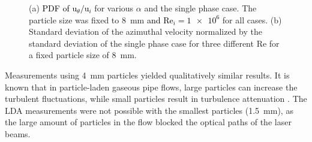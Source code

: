 \documentclass{jfm}
\newcommand\rey{\text{Re}}
\newcommand{\red}[1]{\textcolor{black}{#1}}
\begin{document}
\begin{figure}
\centering%
%
%
\caption{%
(a) \red{PDF of $\text{u}_\theta / \text{u}_i$} for various $\alpha$ and the
single phase case. The particle size was fixed to \SI{8}{\milli\metre}
\red{and $\rey_i=\num{1e6}$} for all cases. (b) Standard deviation of the
azimuthal velocity normalized by the standard deviation of the single phase
case for three different $\rey$ for a fixed particle size of
\SI{8}{\milli\metre}.} \label{fig:ldaresults}
\end{figure}

Measurements using \SI{4}{\milli\metre} particles yielded qualitatively
similar results. It is known that in particle-laden gaseous pipe flows, large
particles can increase the turbulent fluctuations, while small particles
result in turbulence attenuation \citep{Tsuji1984,Gore1989,Vreman2015}. The
LDA measurements were not possible with the smallest particles
(\SI{1.5}{\milli\metre}), as the large amount of particles in the flow blocked
the optical paths of the laser beams.
\end{document}
